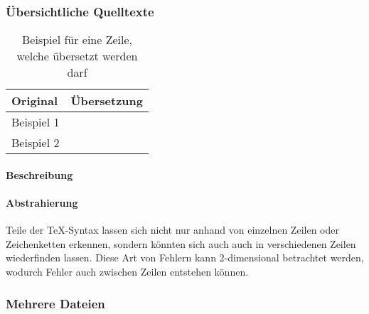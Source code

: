 \subsubsection{Übersichtliche Quelltexte}\label{problems:dim2}
\begin{table}[h!]
    \centering
    \begin{tabularx}{\textwidth}{X X}
        \toprule
            Original & Übersetzung\\
        \midrule
            Beispiel 1 & \\[2em]
            Beispiel 2 & \\
        \bottomrule
    \end{tabularx}
    \caption{Beispiel für eine Zeile, welche übersetzt werden darf}\label{tab:problems:dim2}
\end{table}


\paragraph*{Beschreibung}
\paragraph*{Abstrahierung}
Teile der \TeX-Syntax lassen sich nicht nur anhand von einzelnen Zeilen oder Zeichenketten erkennen, sondern könnten sich auch auch in verschiedenen Zeilen wiederfinden lassen. Diese Art von Fehlern kann 2-dimensional betrachtet werden, wodurch Fehler auch zwischen Zeilen entstehen können.

\newpage

\subsubsection{Mehrere Dateien}\label{problems:dim3}

